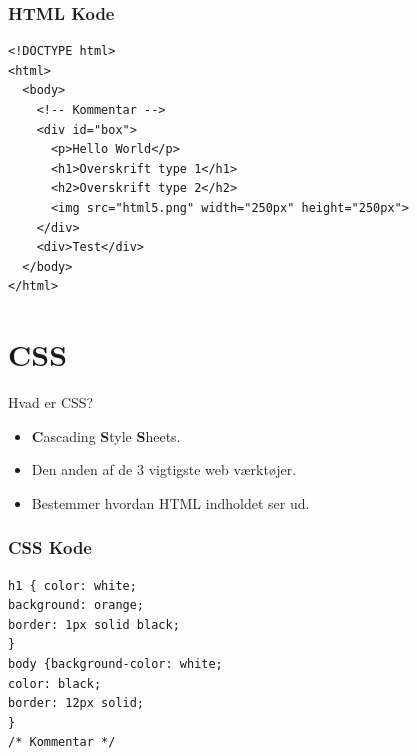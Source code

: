 \documentclass[10pt]{beamer}
\begin{document}
\begin{frame}[fragile]
 \frametitle{HTML Kode}

\begin{lstlisting}
<!DOCTYPE html>
<html>
  <body>
    <!-- Kommentar -->
    <div id="box">
      <p>Hello World</p>
      <h1>Overskrift type 1</h1>
      <h2>Overskrift type 2</h2>
      <img src="html5.png" width="250px" height="250px">
    </div>
    <div>Test</div>
  </body>
</html>
\end{lstlisting}
\end{frame}


 
\section{CSS}


\begin{frame}{Hvad er CSS?}
\begin{itemize}
	\item \textbf{C}ascading \textbf{S}tyle \textbf{S}heets.
	\item Den anden af de 3 vigtigste web værktøjer.
	\item Bestemmer hvordan HTML indholdet ser ud.
\end{itemize}
\end{frame}

\begin{frame}[fragile]
 \frametitle{CSS Kode}

\begin{lstlisting}
h1 { color: white;
background: orange;
border: 1px solid black;
}
body {background-color: white;
color: black;
border: 12px solid;
}
/* Kommentar */
\end{lstlisting}
\end{frame}
\end{document}
